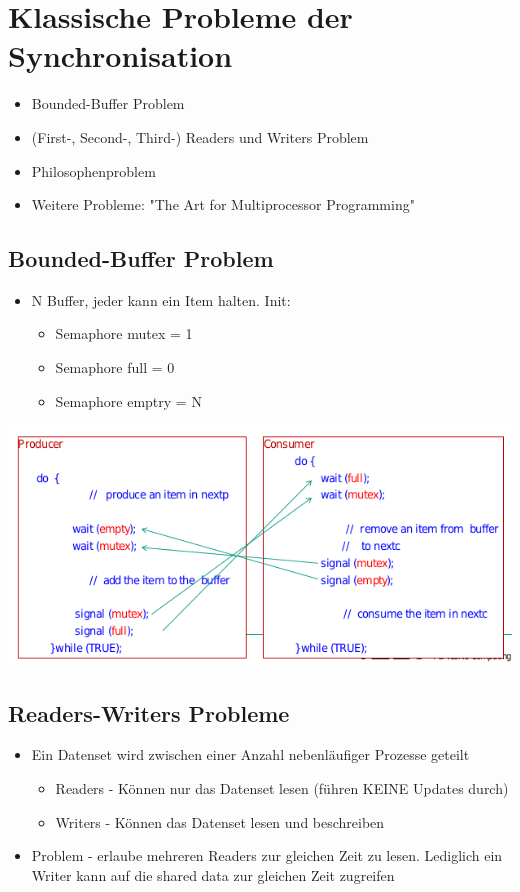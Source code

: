 \documentclass[a4paper]{scrreprt}
\begin{document}
\section{Klassische Probleme der Synchronisation}
		\begin{itemize}
			\item Bounded-Buffer Problem
			\item (First-, Second-, Third-) Readers und Writers Problem
			\item Philosophenproblem
			\item Weitere Probleme: "The Art for Multiprocessor Programming"
		\end{itemize}
		
	\subsection{Bounded-Buffer Problem}
		\begin{itemize}
			\item N Buffer, jeder kann ein Item halten. Init:
				\begin{itemize}
					\item Semaphore mutex = 1
					\item Semaphore full = 0
					\item Semaphore emptry = N
				\end{itemize}
		\end{itemize}
	\includegraphics[scale=0.75] {boundedbufferprob.png}
	
	\subsection{Readers-Writers Probleme}
		\begin{itemize}
			\item Ein Datenset wird zwischen einer Anzahl nebenläufiger Prozesse geteilt
			\begin{itemize}
				\item Readers - Können nur das Datenset lesen (führen KEINE Updates durch)
				\item Writers - Können das Datenset lesen und beschreiben
			\end{itemize}
			\item Problem - erlaube mehreren Readers zur gleichen Zeit zu lesen. Lediglich ein Writer kann auf die shared data zur gleichen Zeit zugreifen
		\end{itemize}
			
\end{document}
